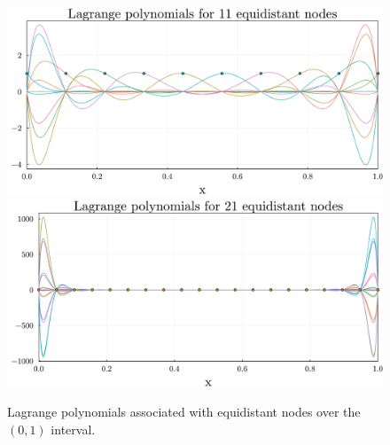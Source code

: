 \begin{figure}[ht]
    \centering
    \includegraphics[width=0.8\linewidth]{figures/lagrange_10.pdf}
    \includegraphics[width=0.8\linewidth]{figures/lagrange_20.pdf}
    \caption{Lagrange polynomials associated with equidistant nodes over the $(0, 1)$ interval.}%
    \label{fig:lagrange}
\end{figure}

